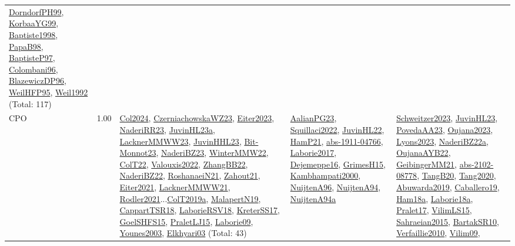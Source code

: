 {\begin{longtable}{p{3cm}r>{\raggedright\arraybackslash}p{6cm}>{\raggedright\arraybackslash}p{6cm}>{\raggedright\arraybackslash}p{8cm}}
\hyperref[detail:DorndorfPH99]{DorndorfPH99}, \hyperref[detail:KorbaaYG99]{KorbaaYG99}, \hyperref[detail:Baptiste1998]{Baptiste1998}, \hyperref[detail:PapaB98]{PapaB98}, \hyperref[detail:BaptisteP97]{BaptisteP97}, \hyperref[detail:Colombani96]{Colombani96}, \hyperref[detail:BlazewiczDP96]{BlazewiczDP96}, \hyperref[detail:WeilHFP95]{WeilHFP95}, \hyperref[detail:Weil1992]{Weil1992} (Total: 117)\\
\index{CPO}\index{CPSystems!CPO}CPO &  1.00 & \hyperref[detail:Col2024]{Col2024}, \hyperref[detail:CzerniachowskaWZ23]{CzerniachowskaWZ23}, \hyperref[detail:Eiter2023]{Eiter2023}, \hyperref[detail:NaderiRR23]{NaderiRR23}, \hyperref[detail:JuvinHL23a]{JuvinHL23a}, \hyperref[detail:LacknerMMWW23]{LacknerMMWW23}, \hyperref[detail:JuvinHHL23]{JuvinHHL23}, \hyperref[detail:Bit-Monnot23]{Bit-Monnot23}, \hyperref[detail:NaderiBZ23]{NaderiBZ23}, \hyperref[detail:WinterMMW22]{WinterMMW22}, \hyperref[detail:ColT22]{ColT22}, \hyperref[detail:Valouxis2022]{Valouxis2022}, \hyperref[detail:ZhangBB22]{ZhangBB22}, \hyperref[detail:NaderiBZ22]{NaderiBZ22}, \hyperref[detail:RoshanaeiN21]{RoshanaeiN21}, \hyperref[detail:Zahout21]{Zahout21}, \hyperref[detail:Eiter2021]{Eiter2021}, \hyperref[detail:LacknerMMWW21]{LacknerMMWW21}, \hyperref[detail:Rodler2021]{Rodler2021}...\hyperref[detail:ColT2019a]{ColT2019a}, \hyperref[detail:MalapertN19]{MalapertN19}, \hyperref[detail:CappartTSR18]{CappartTSR18}, \hyperref[detail:LaborieRSV18]{LaborieRSV18}, \hyperref[detail:KreterSS17]{KreterSS17}, \hyperref[detail:GoelSHFS15]{GoelSHFS15}, \hyperref[detail:PraletLJ15]{PraletLJ15}, \hyperref[detail:Laborie09]{Laborie09}, \hyperref[detail:Younes2003]{Younes2003}, \hyperref[detail:Elkhyari03]{Elkhyari03} (Total: 43) & \hyperref[detail:AalianPG23]{AalianPG23}, \hyperref[detail:Squillaci2022]{Squillaci2022}, \hyperref[detail:JuvinHL22]{JuvinHL22}, \hyperref[detail:HamP21]{HamP21}, \hyperref[detail:abs-1911-04766]{abs-1911-04766}, \hyperref[detail:Laborie2017]{Laborie2017}, \hyperref[detail:Dejemeppe16]{Dejemeppe16}, \hyperref[detail:GrimesH15]{GrimesH15}, \hyperref[detail:Kambhampati2000]{Kambhampati2000}, \hyperref[detail:NuijtenA96]{NuijtenA96}, \hyperref[detail:NuijtenA94]{NuijtenA94}, \hyperref[detail:NuijtenA94a]{NuijtenA94a} & \hyperref[detail:Schweitzer2023]{Schweitzer2023}, \hyperref[detail:JuvinHL23]{JuvinHL23}, \hyperref[detail:PovedaAA23]{PovedaAA23}, \hyperref[detail:Oujana2023]{Oujana2023}, \hyperref[detail:Lyons2023]{Lyons2023}, \hyperref[detail:NaderiBZ22a]{NaderiBZ22a}, \hyperref[detail:OujanaAYB22]{OujanaAYB22}, \hyperref[detail:GeibingerMM21]{GeibingerMM21}, \hyperref[detail:abs-2102-08778]{abs-2102-08778}, \hyperref[detail:TangB20]{TangB20}, \hyperref[detail:Tang2020]{Tang2020}, \hyperref[detail:Abuwarda2019]{Abuwarda2019}, \hyperref[detail:Caballero19]{Caballero19}, \hyperref[detail:Ham18a]{Ham18a}, \hyperref[detail:Laborie18a]{Laborie18a}, \hyperref[detail:Pralet17]{Pralet17}, \hyperref[detail:VilimLS15]{VilimLS15}, \hyperref[detail:Sahraeian2015]{Sahraeian2015}, \hyperref[detail:BartakSR10]{BartakSR10}, \hyperref[detail:Verfaillie2010]{Verfaillie2010}, \hyperref[detail:Vilim09]{Vilim09}, 
\end{longtable}}
